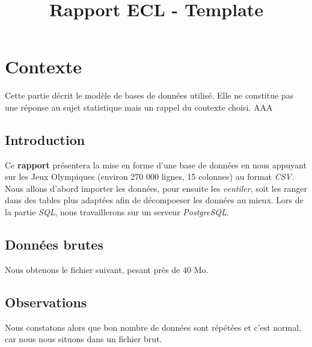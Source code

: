 \documentclass{mytex}
\title{Rapport ECL - Template} %
\begin{document}





        
\fairemarges %
\fairepagedegarde %
\tabledematieres %


\section{Contexte} 

Cette partie décrit le modèle de bases de données utilisé. Elle ne constitue pas une réponse au sujet statistique mais un rappel du contexte choisi.
AAA

\subsection {Introduction}
Ce \textbf{rapport} présentera la mise en forme d'une base de données en nous appuyant sur les Jeux Olympiques (environ 270 000 lignes, 15 colonnes) au format \emph{CSV}. Nous allons d'abord importer les données, pour ensuite les \emph{ventiler}, soit les ranger dans des tables plus adaptées afin de décompoeser les données au mieux. Lors de la partie \emph{SQL}, nous travaillerons sur un serveur \emph{PostgreSQL}.

\subsection{Données brutes}

Nous obtenons le fichier suivant, pesant près de 40 Mo.



\subsection{Observations}
Nous constatons alors que bon nombre de données sont répétées et c'est normal, car nous nous situons dans un fichier brut.
\end{document}

